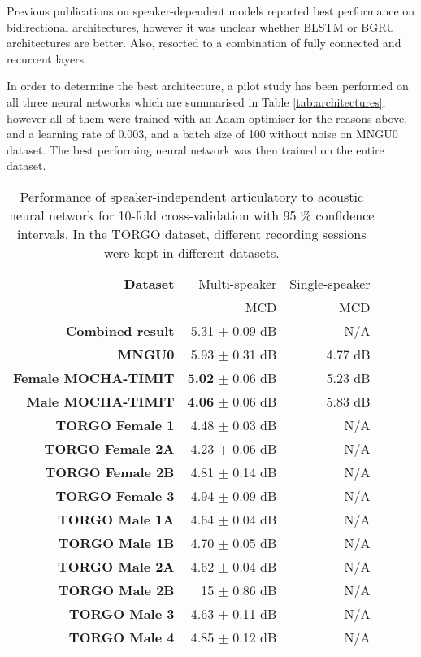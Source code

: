 \documentclass[a4paper]{article}
\begin{document}
Previous publications on speaker-dependent models reported best
performance on bidirectional architectures, however it was unclear whether
BLSTM or BGRU architectures are better. Also, \cite{Taguchi} resorted to
a combination of fully connected and recurrent layers.

In order to determine the best architecture, a pilot study has been
performed on all three neural networks which are summarised in Table \ref{tab:architectures},
however all of them were trained with an Adam optimiser for the reasons above, and a learning rate
of \( 0.003 \), and a batch size of 100 without noise on MNGU0 dataset.
The best performing neural network was then trained on the entire dataset.

\begin{table}[th]
  \caption{Performance of speaker-independent articulatory to acoustic neural network for 10-fold cross-validation with 95 \% confidence intervals. In the TORGO dataset, different recording sessions were
    kept in different datasets. }
  \label{tab:all_data}
  \centering
  \footnotesize

  \begin{tabular}{ r r r }
    \toprule
    \textbf{Dataset} & Multi-speaker & Single-speaker \\
    & MCD & MCD \\
    \midrule 
    \textbf{Combined result} & 5.31 $\pm$ 0.09 dB & N/A \\  
    \midrule
    \textbf{MNGU0} & 5.93 $\pm$ 0.31 dB & 4.77 dB \\
    \textbf{Female MOCHA-TIMIT} & \textbf{5.02} $\pm$ 0.06 dB  & 5.23 dB \\
    \textbf{Male MOCHA-TIMIT} & \textbf{4.06} $\pm$ 0.06 dB & 5.83 dB \\
    \textbf{TORGO Female 1} & 4.48 $\pm$ 0.03 dB & N/A \\
    \textbf{TORGO Female 2A} & 4.23 $\pm$ 0.06 dB & N/A \\
    \textbf{TORGO Female 2B} & 4.81 $\pm$ 0.14 dB & N/A \\
    \textbf{TORGO Female 3} & 4.94 $\pm$ 0.09 dB & N/A \\
    \textbf{TORGO Male 1A} & 4.64 $\pm$ 0.04 dB & N/A \\
    \textbf{TORGO Male 1B} & 4.70 $\pm$ 0.05 dB & N/A \\
    \textbf{TORGO Male 2A} & 4.62 $\pm$ 0.04 dB & N/A \\
    \textbf{TORGO Male 2B} & 15 $\pm$ 0.86 dB & N/A\\
    \textbf{TORGO Male 3} & 4.63 $\pm$ 0.11 dB & N/A \\
    \textbf{TORGO Male 4} & 4.85 $\pm$ 0.12 dB & N/A \\
    \bottomrule
  \end{tabular}
\end{table}
\end{document}
